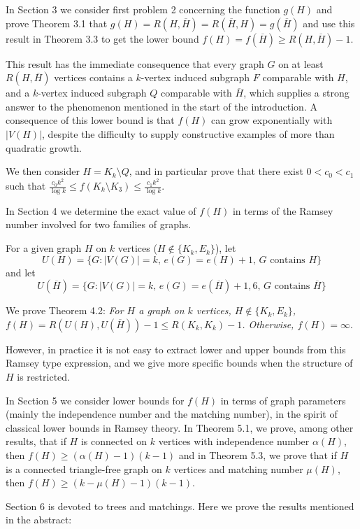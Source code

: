\documentclass[a4paper,12pt]{article}
\begin{document}
In Section 3   we consider first problem 2 concerning the function $g(H)$ and prove  Theorem 3.1 that  $g(H) = R(H,\overline{H}) = R(\overline{H},H) = g(\overline{H})$ and use this result in Theorem 3.3 to get the lower bound $ f(H) = f(\overline{H})  \geq R(H,\overline{H}) - 1$. 

This result has the immediate consequence that every graph $G$ on at least $R(H,\overline{H})$ vertices contains a $k$-vertex induced subgraph $F$ comparable with $H$, and a $k$-vertex induced subgraph $Q$ comparable with $\overline{H}$, which supplies a strong answer to the phenomenon mentioned in the start of the introduction.  A consequence of this lower bound is that  $f(H)$ can grow exponentially with $|V (H)|$, despite the difficulty to supply constructive examples of more than quadratic growth.

We then consider $H = K_k \setminus Q$, and in particular prove that there exist $0 < c_0 < c_1$  such that $\frac{c_0k^2}{\log k} \leq  f(K_k\setminus K_3) \leq \frac{c_1k^2}{\log k}$.

In Section 4 we determine the exact value of $f(H)$ in terms of the Ramsey number involved  for two families of graphs.

For a given graph $H$ on $k$ vertices ($H \notin \{K_k,E_k\}$), let \[U(H) = \{G : |V (G)| = k, \, e(G) = e(H) + 1, \, G \mbox{ contains } H\}\]  and let \[U(\overline{H}) = \{G : |V (G)| = k, \, e(G) = e(\overline{H}) + 1, 6, \, G \mbox{ contains } \overline{H}\}\]

We prove Theorem 4.2:
\noindent \textit{For $H$ a graph on $k$ vertices, $H \notin \{K_k,E_k\}$, $f(H) = R(U(H), U(\overline{H})) -1 \leq R(K_k,K_k) -1$. Otherwise,  $f(H) =\infty$}.

However, in practice it is not easy to extract lower and upper bounds from this Ramsey type expression, and we give more specific bounds when the structure of $H$ is restricted.  

In Section 5 we consider lower bounds for $f(H)$ in terms of graph parameters (mainly the independence number and the matching number), in the spirit of classical lower bounds in Ramsey theory.   In Theorem 5.1, we prove, among other results,  that if $H$ is connected  on $k$ vertices with independence number $\alpha(H)$, then $f(H) \geq (\alpha(H) - 1)(k - 1)$ and in Theorem 5.3,  we prove that if $H$ is a connected triangle-free graph on $k$ vertices and matching number $\mu(H)$, then $f(H) \geq (k - \mu(H) - 1)(k - 1)$. 

Section 6 is devoted to trees and matchings. Here we prove the results mentioned in the abstract:
\end{document}

